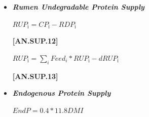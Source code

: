 \documentclass{article}
\begin{document}
\begin{refsection}
\begin{itemize}
    \begin{center}
        \(RDPi = 0 ,\ if\ Kpi + Kdi \leq 0 \)
    \end{center}
        \vspace{0.5cm}
    
            {\raggedleft \textbf{[AN.SUP.10]}\par}
            \vspace{0.5cm}

    \begin{center}
        \(MPbact = 0.64 * min(1000 * 0.13 * TDNact_{\text{diet}}, 1000 * 0.85 * RDP_{\text{diet}})\)
    \end{center}
        \vspace{0.5cm}
    
            {\raggedleft \textbf{[AN.SUP.11]}\par}
            \vspace{0.5cm}

        \item \textbf{\textit{Rumen Undegradable Protein Supply}}
        \vspace{0.25cm}

    \begin{center}
        \(RUP_{\text{i}} = CP_{\text{i}} - RDP_{\text{i}}\)
    \end{center}
        \vspace{0.5cm}
    
            {\raggedleft \textbf{[AN.SUP.12]}\par}
            \vspace{0.5cm}

    \begin{center}
        \(RUP_{\text{i}} = \sum_{i}Feed_{i} * RUP_{\text{i}} - dRUP_{\text{i}}\)
    \end{center}
        \vspace{0.5cm}
    
            {\raggedleft \textbf{[AN.SUP.13]}\par}
            \vspace{0.5cm}

        \item \textbf{\textit{Endogenous Protein Supply}}
        \vspace{0.25cm}
    \begin{center}
        \(EndP = 0.4 * 11.8 DMI\)
    \end{center}
        \vspace{0.5cm}            
    \end{itemize}
    \vspace{0.25cm}


\end{refsection}
\end{document}
